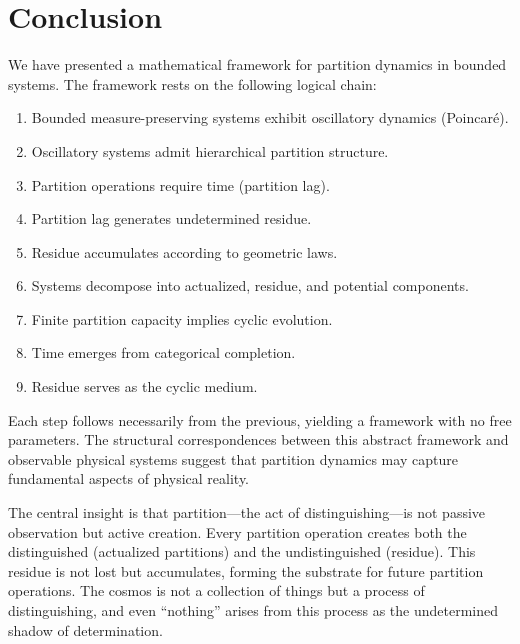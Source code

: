 \documentclass[twocolumn,10pt,a4paper]{article}
\theoremstyle{definition}
\theoremstyle{remark}
\begin{document}
\section{Conclusion}
\label{sec:conclusion}

We have presented a mathematical framework for partition dynamics in bounded systems. The framework rests on the following logical chain:

\begin{enumerate}
    \item Bounded measure-preserving systems exhibit oscillatory dynamics (Poincar\'{e}).

    \item Oscillatory systems admit hierarchical partition structure.

    \item Partition operations require time (partition lag).

    \item Partition lag generates undetermined residue.

    \item Residue accumulates according to geometric laws.

    \item Systems decompose into actualized, residue, and potential components.

    \item Finite partition capacity implies cyclic evolution.

    \item Time emerges from categorical completion.

    \item Residue serves as the cyclic medium.
\end{enumerate}

Each step follows necessarily from the previous, yielding a framework with no free parameters. The structural correspondences between this abstract framework and observable physical systems suggest that partition dynamics may capture fundamental aspects of physical reality.

The central insight is that partition---the act of distinguishing---is not passive observation but active creation. Every partition operation creates both the distinguished (actualized partitions) and the undistinguished (residue). This residue is not lost but accumulates, forming the substrate for future partition operations. The cosmos is not a collection of things but a process of distinguishing, and even ``nothing'' arises from this process as the undetermined shadow of determination.
\end{document}
